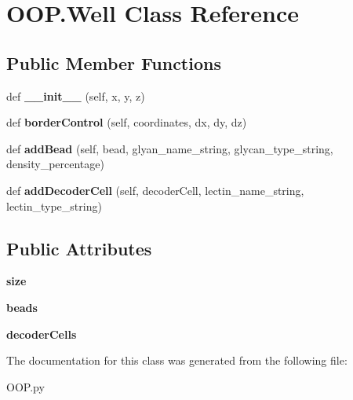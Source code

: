 \hypertarget{class_o_o_p_1_1_well}{}\section{O\+O\+P.\+Well Class Reference}
\label{class_o_o_p_1_1_well}
\subsection*{Public Member Functions}
\begin{DoxyCompactItemize}
\item 
\mbox{\label{class_o_o_p_1_1_well_a360c562719df1b228ddafc6819678f87}} 
def {\bfseries \+\_\+\+\_\+init\+\_\+\+\_\+} (self, x, y, z)
\item 
\mbox{\label{class_o_o_p_1_1_well_a789cba9c9e1948633d58b0c49f162b06}} 
def {\bfseries border\+Control} (self, coordinates, dx, dy, dz)
\item 
\mbox{\label{class_o_o_p_1_1_well_af0c52742fe74e6d7472730de97533164}} 
def {\bfseries add\+Bead} (self, bead, glyan\+\_\+name\+\_\+string, glycan\+\_\+type\+\_\+string, density\+\_\+percentage)
\item 
\mbox{\label{class_o_o_p_1_1_well_aaeea044ae7dd98ef5dfcee8d9b196449}} 
def {\bfseries add\+Decoder\+Cell} (self, decoder\+Cell, lectin\+\_\+name\+\_\+string, lectin\+\_\+type\+\_\+string)
\end{DoxyCompactItemize}
\subsection*{Public Attributes}
\begin{DoxyCompactItemize}
\item 
\mbox{\label{class_o_o_p_1_1_well_aac8afc46bb7b6c338653c967371f57f7}} 
{\bfseries size}
\item 
\mbox{\label{class_o_o_p_1_1_well_a12c52294dba829502ef3b3e8765010d8}} 
{\bfseries beads}
\item 
\mbox{\label{class_o_o_p_1_1_well_a5911c7535990ded47917e84c165b4760}} 
{\bfseries decoder\+Cells}
\end{DoxyCompactItemize}


The documentation for this class was generated from the following file\+:\begin{DoxyCompactItemize}
\item 
O\+O\+P.\+py\end{DoxyCompactItemize}
